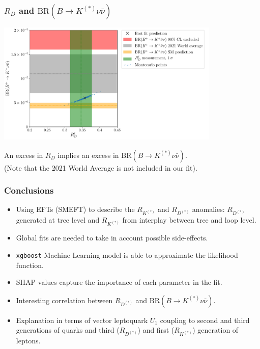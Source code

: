 \documentclass[mathserif, 10pt]{beamer}
\begin{document}
\begin{frame}
    \frametitle{$R_D$ and $\mathrm{BR}(B\to K^{(*)}\nu\bar{\nu})$}

    \begin{center}
        \includegraphics[width=0.8\textwidth]{figures/RD_BKnunu.pdf}
    \end{center}

    An excess in $R_D$ implies an excess in $\mathrm{BR}(B\to K^{(*)}\nu\bar{\nu})$. \\(Note that the {\color{gray}2021 World Average} is not included in our fit).

\end{frame}

\begin{frame}
  \frametitle{Conclusions}

  \begin{itemize}
    \item Using EFTs (SMEFT) to describe the $R_{K^{(*)}}$ and $R_{D^{(*)}}$ anomalies: $R_{D^{(*)}}$ generated at tree level and $R_{K^{(*)}}$ from interplay between tree and loop level.
    \item Global fits are needed to take in account possible side-effects.
    \item \texttt{xgboost} Machine Learning model is able to approximate the likelihood function.
    \item SHAP values capture the importance of each parameter in the fit.
    \item Interesting correlation between $R_{D^{(*)}}$ and $\mathrm{BR}(B\to K^{(*)}\nu\bar{\nu})$.
    \item Explanation in terms of vector leptoquark $U_1$ coupling to second and third generations of quarks and third ($R_{D^{(*)}}$) and first ($R_{K^{(*)}}$) generation of leptons.
  \end{itemize}

\end{frame}
\appendix
\end{document}
